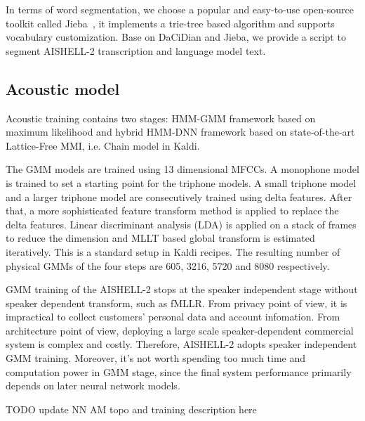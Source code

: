 \documentclass[a4paper]{article}
\begin{document}
In terms of word segmentation, we choose a popular and easy-to-use open-source
toolkit called Jieba~\cite{jieba}, it implements a trie-tree based algorithm and
supports vocabulary customization.  Base on DaCiDian and Jieba, we provide a
script to segment AISHELL-2 transcription and language model text.

\subsection{Acoustic model}

Acoustic training contains two stages: HMM-GMM framework based on maximum likelihood and hybrid HMM-DNN
framework based on state-of-the-art Lattice-Free MMI, i.e. Chain model in Kaldi.

The GMM models are trained using 13 dimensional MFCCs.
A monophone model is trained to set a starting point for the
triphone models. A small triphone model and a larger triphone model are
consecutively trained using delta features. After that, a more sophisticated
feature transform method is applied to replace the delta features. Linear
discriminant analysis (LDA) is applied on a stack of frames to reduce the
dimension and MLLT based global transform is estimated iteratively. This is a
standard setup in Kaldi recipes. The resulting number of physical GMMs of the
four steps are 605, 3216, 5720 and 8080 respectively.

GMM training of the AISHELL-2 stops at the speaker independent stage
without speaker dependent transform, such as fMLLR. From privacy point of view,
it is impractical to collect customers' personal data and account
infomation. From architecture point of view, deploying a large scale
speaker-dependent commercial system is complex and costly. Therefore, AISHELL-2
adopts speaker independent GMM training. Moreover, it's not worth 
spending too much time and computation power in GMM stage, since the final system 
performance primarily depends on later neural network models.

TODO update NN AM topo and training description here

\end{document}
